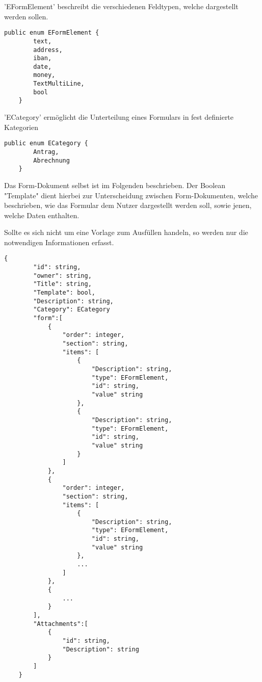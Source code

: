 'EFormElement' beschreibt die verschiedenen Feldtypen, welche dargestellt werden sollen.
\begin{lstlisting}[label={lst:EFormElement}]
    public enum EFormElement {
        text,
        address,
        iban,
        date,
        money,
        TextMultiLine,
        bool
    }
\end{lstlisting}


'ECategory' ermöglicht die Unterteilung eines Formulars in fest definierte Kategorien
\begin{lstlisting}[label={lst:ECategory}]
    public enum ECategory {
        Antrag,
        Abrechnung
    }
\end{lstlisting}

Das Form-Dokument selbst ist im Folgenden beschrieben.
Der Boolean "Template" dient hierbei zur Unterscheidung zwischen
Form-Dokumenten, welche beschrieben, wie das Formular dem Nutzer
dargestellt werden soll, sowie jenen, welche Daten enthalten.

Sollte es sich nicht um eine Vorlage zum Ausfüllen handeln, so werden nur die notwendigen Informationen erfasst.
\begin{lstlisting}[label={lst:lstlistingdoc}]
    {
        "id": string,
        "owner": string,
        "Title": string,
        "Template": bool,
        "Description": string,
        "Category": ECategory
        "form":[
            {
                "order": integer,
                "section": string,
                "items": [
                    {
                        "Description": string,
                        "type": EFormElement,
                        "id": string,
                        "value" string
                    },
                    {
                        "Description": string,
                        "type": EFormElement,
                        "id": string,
                        "value" string
                    }
                ]
            },
            {
                "order": integer,
                "section": string,
                "items": [
                    {
                        "Description": string,
                        "type": EFormElement,
                        "id": string,
                        "value" string
                    },
                    ...
                ]
            },
            {
                ...
            }
        ],
        "Attachments":[
            {
                "id": string,
                "Description": string
            }
        ]
    }
\end{lstlisting}